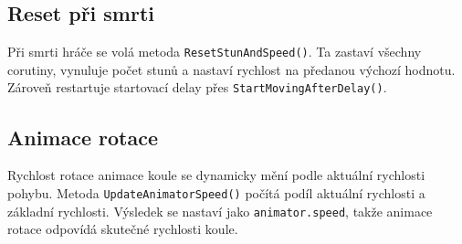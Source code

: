 \subsection{Reset při smrti}
Při smrti hráče se volá metoda \texttt{ResetStunAndSpeed()}. Ta zastaví všechny corutiny, vynuluje počet stunů a nastaví rychlost na předanou výchozí hodnotu. Zároveň restartuje startovací delay přes \texttt{StartMovingAfterDelay()}.

\subsection{Animace rotace}
Rychlost rotace animace koule se dynamicky mění podle aktuální rychlosti pohybu. Metoda \texttt{UpdateAnimatorSpeed()} počítá podíl aktuální rychlosti a základní rychlosti. Výsledek se nastaví jako \texttt{animator.speed}, takže animace rotace odpovídá skutečné rychlosti koule.
